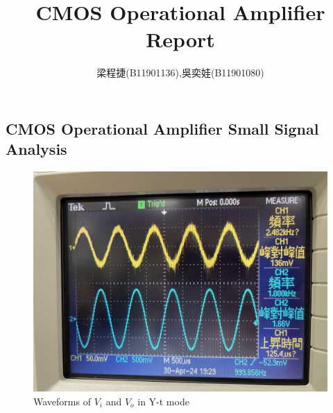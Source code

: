 \documentclass{article}
\title{CMOS Operational Amplifier Report}
\author{梁程捷(B11901136),吳奕娃(B11901080)}
\date{}
\begin{document}
\begin{CJK*}{UTF8}{bkai}
\maketitle

\section*{CMOS Operational Amplifier Small Signal Analysis}

\begin{figure}[H]
\begin{center}
    \includegraphics[scale = 0.2]{vo_n_vi_vtgraph.jpg}
    \caption{Waveforms of $V_i$ and $V_o$ in Y-t mode}
\end{center}
\end{figure}


\end{CJK*}
\end{document}
